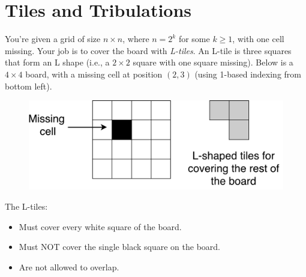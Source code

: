 \section{Tiles and Tribulations}

You're given a grid of size $n \times n$, where $n = 2^k$ for some $k \ge 1$, with one cell missing. Your job is to cover the board with \textit{L-tiles}. An L-tile is three squares that form an L shape (i.e., a $2\times 2$ square with one square missing). Below is a $4 \times 4$ board, with a missing cell at position $(2,3)$ (using 1-based indexing from bottom left).

\begin{figure}[tbh!]
	\centering
	\includegraphics[width=0.6\columnwidth]{a4-tiles.pdf}
\end{figure}

The L-tiles:
\begin{itemize}
	\item Must cover every white square of the board.
	\item Must NOT cover the single black square on the board.
	\item Are not allowed to overlap.
\end{itemize}

